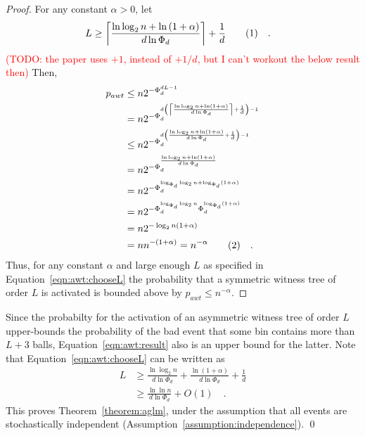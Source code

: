 \documentclass[a4paper,12pt]{article}
\newcommand\todo[1]{\textcolor{red}{(TODO: #1)}}
\newcommand\numberthis{\addtocounter{equation}{1}\tag{\theequation}}
\newcommand\neqn[1]{\numberthis\label{eqn:#1}}
\begin{document}
\begin{proof}
For any constant $\alpha > 0$, let 
\begin{align*}
L &\geq \left\lceil{\frac{\ln\log_2 n + \ln\left(1+\alpha\right)}{d \ln \Phi_d}}\right\rceil+\frac{1}{d} \neqn{awt:chooseL}\quad .
\end{align*}
\todo{the paper uses $+1$, instead of $+1/d$, but I can't workout the below result then} 
Then, 
\begin{align*}
p_{awt} &\leq n  2^{-\Phi_d^{d L -1}} \\
        &= n  2^{-\Phi_d^{d \left(\left\lceil{\frac{\ln\log_2 n + \ln\left(1+\alpha\right)}{d \ln \Phi_d}}\right\rceil+\frac{1}{d}\right) -1}} \\
        &\leq n  2^{-\Phi_d^{d \left({\frac{\ln\log_2 n + \ln\left(1+\alpha\right)}{d \ln \Phi_d}}+\frac{1}{d}\right) -1}} \\
        &= n  2^{-\Phi_d^{{\frac{\ln\log_2 n + \ln\left(1+\alpha\right)}{d \ln \Phi_d}}}} \\
        &= n  2^{-\Phi_d^{\log_{\Phi_d}\log_2 n + \log_{\Phi_d}\left(1+\alpha\right)}} \\
         &= n  2^{-\Phi_d^{\log_{\Phi_d}\log_2 n} \Phi_d^{ \log_{\Phi_d}\left(1+\alpha\right)}} \\
         &= n  2^{-\log_2 n \left(1+\alpha\right)} \\
         &= n  n ^{-(1+\alpha)} = n^{-\alpha} \neqn{awt:result} \quad .
\end{align*}
Thus, for any constant $\alpha$ and large enough $L$ as specified in Equation~\ref{eqn:awt:chooseL} the probability that a symmetric witness tree of order $L$ is activated is bounded above by $p_{awt }\leq n^{-\alpha}$.
\end{proof}

Since the probabilty for the activation of an asymmetric witness tree of order $L$ upper-bounds the probability of the bad event that some bin contains more than $L+3$ balls, Equation~\ref{eqn:awt:result} also is an upper bound for the latter. Note that Equation~\ref{eqn:awt:chooseL} can be written as
\begin{align*}
L &\geq \frac{\ln\log_2 n}{d \ln \Phi_d} + \frac{\ln\left(1+\alpha\right)}{d \ln \Phi_d} + \frac{1}{d}\\
  &\geq \frac{\ln\ln n}{d \ln \Phi_d} + O\left(1\right)\quad .
\end{align*}
This proves Theorem~\ref{theorem:aglm}, under the assumption that all events are stochastically independent (Assumption~\ref{assumption:independence}). \qed
\end{document}

